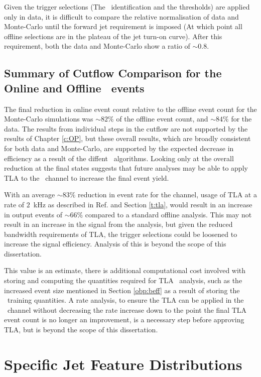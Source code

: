     Given the trigger selections (The \bjet\ identification and the \pt thresholds) are applied only in data, it is difficult to compare the relative normalisation of data and Monte-Carlo until the forward jet requirement is imposed (At which point all offline selections are in the plateau of the jet turn-on curve). After this requirement, both the data and Monte-Carlo show a ratio of $\sim0.8$.

    \subsection{Summary of Cutflow Comparison for the Online and Offline \VBFHBB\ events}

    The final reduction in online event count relative to the offline event count for the Monte-Carlo simulations was $\sim82\%$ of the offline event count, and $\sim84\%$  for the data. The results from individual steps in the cutflow are not supported by the results of Chapter \ref{c:OP}, but these overall results, which are broadly consistent for both data and Monte-Carlo, are supported by the expected decrease in efficiency as a result of the diffent \btag\ algorithms. Looking only at the overall reduction at the final states suggests that future analyses may be able to apply TLA to the \VBFHBB\ channel to increase the final event yield.

    With an average $\sim83\%$ reduction in event rate for the channel, usage of TLA at a rate of $2$~kHz as described in Ref. \cite{tla} and Section \ref{t:tla}, would result in an increase in output events of $\sim66\%$ compared to a standard offline analysis. This may not result in an increase in the signal from the analysis, but given the reduced bandwidth requirements of TLA, the trigger selections could be loosened to increase the signal efficiency. Analysis of this is beyond the scope of this dissertation.

    This value is an estimate, there is additional computational cost involved with storing and computing the quantities required for TLA \VBFHBB\ analysis, such as the increased event size mentioned in Section \ref{obp:beff} as a result of storing the \btag\ training quantities. A rate analysis, to ensure the TLA can be applied in the \VBFHBB\ channel without decreasing the rate increase down to the point the final TLA event count is no longer an improvement, is a necessary step before approving TLA, but is beyond the scope of this dissertation.

\newpage
\section{Specific Jet Feature Distributions}
\label{k:jets}

